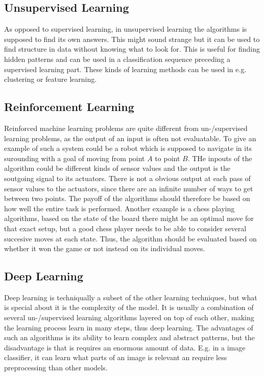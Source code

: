\subsection{Unsupervised Learning}

As opposed to supervised learning, in unsupervised learning the algorithms is supposed to find its own answers. This might sound strange but it can be used to find structure in data without knowing what to look for. This is useful for finding hidden patterns and can be used in a classification sequence preceding a supervised learning part. These kinds of learning methods can be used in e.g. clustering or feature learning.

\subsection{Reinforcement Learning}

Reinforced machine learning problems are quite different from un-/supervised learning problems, as the output of an input is often not evaluatable. To give an example of such a system could be a robot which is supposed to navigate in its surounding with a goal of moving from point $A$ to point $B$. THe inpouts of the algorithm could be different kinds of sensor values and the output is the soutgoing signal to its actuators. There is not a obvious output at each pass of sensor values to the actuators, since there are an infinite number of ways to get between two points. The payoff of the algorithms should therefore be based on how well the entire task is performed. Another example is a chess playing algorithms, based on the state of the board there might be an optimal move for that exact setup, but a good chess player needs to be able to consider several succesive moves at each state. Thus, the algorithm should be evaluated based on whether it won the game or not instead on its individual moves.

\subsection{Deep Learning}

Deep learning is techniqually a subset of the other learning techniques, but what is special about it is the complexity of the model. It is usually a combination of several un-/supervised learning algorithms layered on top of each other, making the learning process learn in many steps, thus deep learning. The advantages of such an algorithms is its ability to learn complex and abstract patterns, but the disadvantage is that is requires an enormous amount of data. E.g. in a image classifier, it can learn what parts of an image is relevant an require less preprocessing than other models.



